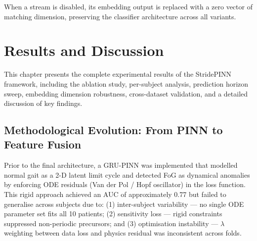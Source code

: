 \documentclass[12pt,a4paper,oneside]{report}
\numberwithin{equation}{chapter}
\numberwithin{figure}{chapter}
\numberwithin{table}{chapter}
\begin{document}
When a stream is disabled, its embedding output is replaced with a zero vector of matching dimension, preserving the classifier architecture across all variants.


\chapter{Results and Discussion}

This chapter presents the complete experimental results of the StridePINN framework, including the ablation study, per-subject analysis, prediction horizon sweep, embedding dimension robustness, cross-dataset validation, and a detailed discussion of key findings.

\section{Methodological Evolution: From PINN to Feature Fusion}

Prior to the final architecture, a GRU-PINN was implemented that modelled normal gait as a 2-D latent limit cycle and detected FoG as dynamical anomalies by enforcing ODE residuals (Van der Pol / Hopf oscillator) in the loss function. This rigid approach achieved an AUC of approximately 0.77 but failed to generalise across subjects due to: (1) inter-subject variability --- no single ODE parameter set fits all 10 patients; (2) sensitivity loss --- rigid constraints suppressed non-periodic precursors; and (3) optimisation instability --- $\lambda$ weighting between data loss and physics residual was inconsistent across folds.
\end{document}
